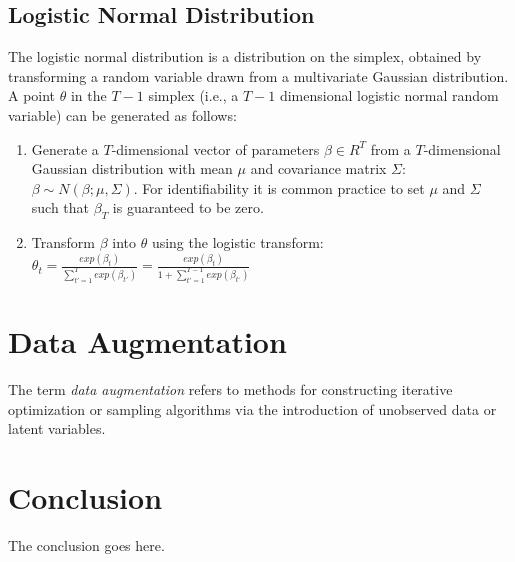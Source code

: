 \documentclass{article} %
\begin{document}
\subsection{Logistic Normal Distribution}
The logistic normal distribution is a distribution on the simplex, obtained by transforming a random variable drawn from a multivariate Gaussian distribution. A point $\theta$ in the $T-1$ simplex (i.e., a $T - 1$ dimensional logistic normal random variable) can be generated as follows:

\begin{enumerate}
\item Generate a $T$-dimensional vector of parameters $\beta \in R^{T}$ from a $T$-dimensional Gaussian distribution with mean $\mu$ and covariance matrix $\Sigma$: $\beta \sim N\left(\beta; \mu, \Sigma \right)$. For identifiability it is common practice to set $\mu$ and $\Sigma$ such that $\beta_{T}$ is guaranteed to be zero.
\item Transform $\beta$ into $\theta$ using the logistic transform: $\theta_{t} = \frac{exp(\beta_{t})}{\sum_{t'=1}^{T}exp(\beta_{t'})} =  \frac{exp(\beta_{t})}{1+\sum_{t'=1}^{T-1}exp(\beta_{t‘})}$
\end{enumerate}

\section{Data Augmentation}
The term \emph{data augmentation} \cite{van2001art} refers to methods for constructing iterative optimization or sampling algorithms via the introduction of unobserved data or latent variables. 

\section{Conclusion}
The conclusion goes here.



\end{document}
